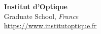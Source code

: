 \documentclass[10pt]{article} %
\begin{document}
\begin{minipage}[t]{.35\linewidth}


\centering
\begin{minipage}[t]{.95\linewidth}
\textbf{Institut d'Optique}\\
Graduate School, \textit{France}\\
\href{https://www.institutoptique.fr}{https://www.institutoptique.fr}
\end{minipage}

\end{minipage}\hfill %
%
%
\end{document}
